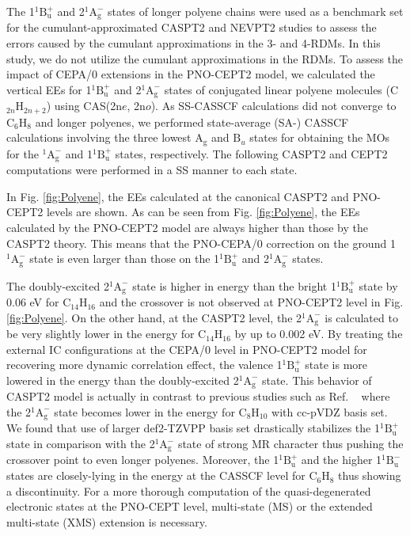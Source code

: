 \documentclass[aip,jcp,amsmath]{revtex4-1}
\begin{document}
%
The 1${}^1\text{B}_\text{u}^{+}$ and 2${}^1\text{A}_\text{g}^{-}$ states of longer polyene chains were used as a benchmark set for the cumulant-approximated CASPT2\cite{doi:10.1063/1.4900878} and NEVPT2\cite{Zgid2009} studies to assess the errors caused by the cumulant approximations in the 3- and 4-RDMs.
%
In this study, we do not utilize the cumulant approximations in the RDMs.
%
To assess the impact of CEPA/0 extensions in the PNO-CEPT2 model, we calculated the vertical EEs for 1${}^1\text{B}_\text{u}^{+}$ and 2${}^1\text{A}_\text{g}^{-}$ states of conjugated linear polyene molecules (C${}_{2n}$H${}_{2n+2}$) using CAS(2n$e$, 2n$o$).
%
As SS-CASSCF calculations did not converge to C${}_6$H${}_8$ and longer polyenes, we performed state-average (SA-) CASSCF calculations involving the three lowest $\text{A}_\text{g}$ and $\text{B}_{u}$ states for obtaining the MOs for the ${}^1\text{A}_\text{g}^{-}$ and 1${}^1\text{B}_\text{u}^{+}$ states, respectively.
%
The following CASPT2 and CEPT2 computations were performed in a SS manner to each state.

%
In Fig. \ref{fig:Polyene}, the EEs calculated at the canonical CASPT2 and PNO-CEPT2 levels are shown.
%
As can be seen from Fig. \ref{fig:Polyene}, the EEs calculated by the PNO-CEPT2 model are always higher than those by the CASPT2 theory.
%
This means that the PNO-CEPA/0 correction on the ground 1${}^1\text{A}_\text{g}^{-}$ state is even larger than those on the 1${}^1\text{B}_\text{u}^{+}$ and 2${}^1\text{A}_\text{g}^{-}$ states.

%
The doubly-excited 2${}^1\text{A}_\text{g}^{-}$ state is higher in energy than the bright 1${}^1\text{B}_\text{u}^{+}$ state by 0.06 eV for C${}_{14}$H${}_{16}$ and the crossover is not observed at PNO-CEPT2 level in Fig. \ref{fig:Polyene}.
%
On the other hand, at the CASPT2 level, the 2${}^1\text{A}_\text{g}^{-}$ is calculated to be very slightly lower in the energy for C${}_{14}$H${}_{16}$ by up to 0.002 eV.
%
By treating the external IC configurations at the CEPA/0 level in PNO-CEPT2 model for recovering more dynamic correlation effect, the valence 1${}^1\text{B}_\text{u}^{+}$ state is more lowered in the energy than the doubly-excited 2${}^1\text{A}_\text{g}^{-}$ state.
%
This behavior of CASPT2 model is actually in contrast to previous studies such as Ref. ~ where the 2${}^1\text{A}_\text{g}^{-}$ state becomes lower in the energy for C$_{8}$H${}_{10}$ with cc-pVDZ basis set.
%
We found that use of larger def2-TZVPP basis set drastically stabilizes the 1${}^1\text{B}_\text{u}^{+}$ state in comparison with the 2${}^1\text{A}_\text{g}^{-}$ state of strong MR character thus pushing the crossover point to even longer polyenes.
%
Moreover, the 1${}^1\text{B}_\text{u}^{+}$ and the higher 1${}^1\text{B}_\text{u}^{-}$ states are closely-lying in the energy at the CASSCF level for C${}_6$H${}_8$ thus showing a discontinuity.
%
For a more thorough computation of the quasi-degenerated electronic states at the PNO-CEPT level, multi-state (MS)\cite{FINLEY1998299} or the extended multi-state (XMS)\cite{ShioWerner2011} extension is necessary.
\end{document}
